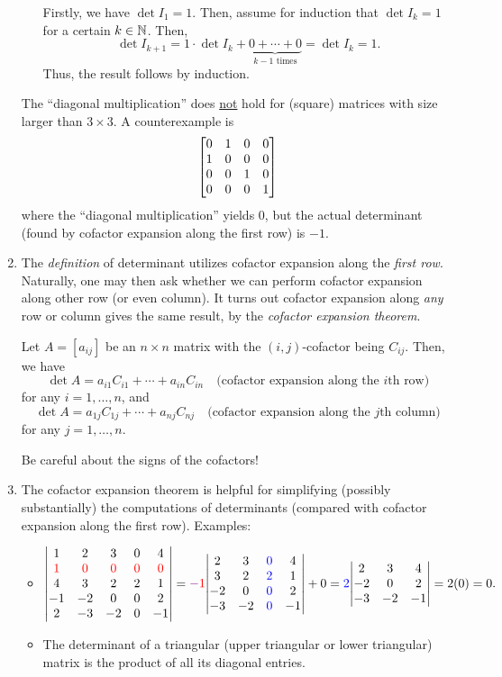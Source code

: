 \begin{enumerate}
\begin{itemize}
\begin{pf}
Firstly, we have \(\det I_1=1\). Then, assume for induction that \(\det I_k=1\)
for a certain \(k\in\mathbb{N}\). Then,
\[
\det I_{k+1}=1\cdot \det I_k+\underbrace{0+\dotsb+0}_{\text{\(k-1\) times}}
=\det I_k=1.
\]
Thus, the result follows by induction.
\end{pf}
\end{itemize}
\begin{warning}
The ``diagonal multiplication'' does \underline{not} hold for (square) matrices
with size larger than \(3\times  3\). A counterexample is
\[
\mqty[0&1&0&0\\ 1&0&0&0\\ 0&0&1&0\\ 0&0&0&1]
\]
where the ``diagonal multiplication'' yields \(0\), but the actual determinant
(found by cofactor expansion along the first row) is \(-1\).
\end{warning}
\item The \emph{definition} of determinant utilizes cofactor expansion along
the \emph{first row}. Naturally, one may then ask whether we can perform
cofactor expansion along other row (or even column). It turns out cofactor
expansion along \emph{any} row or column gives the same result, by the
\emph{cofactor expansion theorem}.

\begin{theorem}
\label{thm:cofactor-expansion}
Let \(A=[a_{ij}]\) be an \(n\times n\) matrix with the \((i,j)\)-cofactor being
\(C_{ij}\). Then, we have
\[
\det A=a_{i1}C_{i1}+\dotsb+a_{in}C_{in}\quad\text{(cofactor expansion along the \(i\)th row)}
\]
for any \(i=1,\dotsc,n\), and
\[
\det A=a_{1j}C_{1j}+\dotsb+a_{nj}C_{nj}\quad\text{(cofactor expansion along the \(j\)th column)}
\]
for any \(j=1,\dotsc,n\).
\end{theorem}
\begin{warning}
Be careful about the signs of the cofactors!
\end{warning}

\item The cofactor expansion theorem is helpful for simplifying (possibly
substantially) the computations of determinants (compared with cofactor
expansion along the first row). Examples:
\begin{itemize}
\item \(\displaystyle 
\mqty|
1&2&3&0&4\\
\rc{1}&\rc{0}&\rc{0}&\rc{0}&\rc{0}\\
4&3&2&2&1\\
-1&-2&0&0&2\\
2&-3&-2&0&-1
|
=\vc{-}\rc{1}\mqty|
2&3&\blc{0}&4\\
3&2&\blc{2}&1\\
-2&0&\blc{0}&2\\
-3&-2&\blc{0}&-1
|+0
=
\blc{2}\mqty|
2&3&4\\
-2&0&2\\
-3&-2&-1
|
=2(0)
=0.
\)
\item The determinant of a triangular (upper triangular or lower triangular)
matrix is the product of all its diagonal entries.


\end{itemize}
\end{enumerate}
